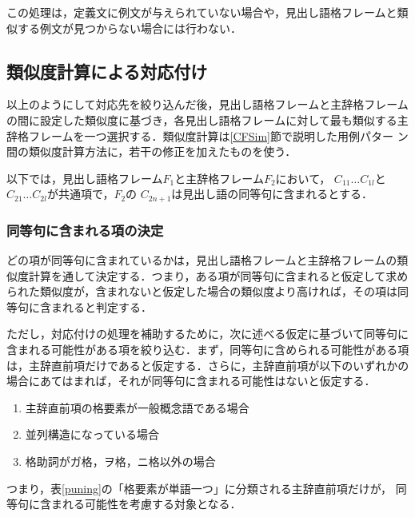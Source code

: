 この処理は，定義文に例文が与えられていない場合や，見出し語格フレームと類
似する例文が見つからない場合には行わない．


\subsection{類似度計算による対応付け}

以上のようにして対応先を絞り込んだ後，見出し語格フレームと主辞格フレーム
の間に設定した類似度に基づき，各見出し語格フレームに対して最も類似する主
辞格フレームを一つ選択する．類似度計算は\ref{CFSim}節で説明した用例パター
ン間の類似度計算方法に，若干の修正を加えたものを使う．

以下では，見出し語格フレーム$F_1$と主辞格フレーム$F_2$において，
$C_{11}\dots C_{1l} $と$C_{21} \dots C_{2l}$が共通項で，$F_2$の
$C_{2n+1}$は見出し語の同等句に含まれるとする．

\begin{quote}
   \tr{\dots}{}{\dots}
  \tr{\dots}{}{\dots}  
\end{quote}


\subsubsection{同等句に含まれる項の決定}

どの項が同等句に含まれているかは，見出し語格フレームと主辞格フレームの類
似度計算を通して決定する．つまり，ある項が同等句に含まれると仮定して求め
られた類似度が，含まれないと仮定した場合の類似度より高ければ，その項は同
等句に含まれると判定する．

ただし，対応付けの処理を補助するために，次に述べる仮定に基づいて同等句に
含まれる可能性がある項を絞り込む．まず，同等句に含められる可能性がある項
は，主辞直前項だけであると仮定する．さらに，主辞直前項が以下のいずれかの
場合にあてはまれば，それが同等句に含まれる可能性はないと仮定する．

\begin{enumerate}
 \item 主辞直前項の格要素が一般概念語である場合
 \item 並列構造になっている場合
 \item 格助詞がガ格，ヲ格，ニ格以外の場合
\end{enumerate}

つまり，表\ref{puning}の「格要素が単語一つ」に分類される主辞直前項だけが，
同等句に含まれる可能性を考慮する対象となる．



